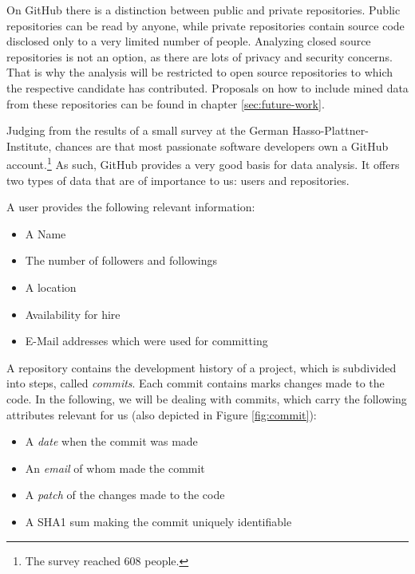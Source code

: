 On GitHub there is a distinction between public and private repositories. Public repositories can be read by anyone, while private repositories contain source code disclosed only to a very limited number of people. Analyzing closed source repositories is not an option, as there are lots of privacy and security concerns. That is why the analysis will be restricted to open source repositories to which the respective candidate has contributed. Proposals on how to include mined data from these repositories can be found in chapter \ref{sec:future-work}.
\newline


Judging from the results of a small survey at the German Hasso-Plattner-Institute, chances are that most passionate software developers own a GitHub account.\footnote{The survey reached 608 people.}
As such, GitHub provides a very good basis for data analysis. It offers two types of data that are of importance to us: users and repositories.
\newline

A user provides the following relevant information:
\begin{itemize}
  \item A Name
  \item The number of followers and followings
  \item A location
  \item Availability for hire
  \item E-Mail addresses which were used for committing
\end{itemize}
\vspace{1em}

\noindent A repository contains the development history of a project, which is subdivided into steps, called \textit{commits}. Each commit contains marks changes made to the code. In the following, we will be dealing with commits, which carry the following attributes relevant for us (also depicted in Figure \ref{fig:commit}):

\begin{itemize}
    \item A \textit{date} when the commit was made
    \item An \textit{email} of whom made the commit
    \item A \textit{patch} of the changes made to the code
    \item A SHA1 sum making the commit uniquely identifiable
\end{itemize}

